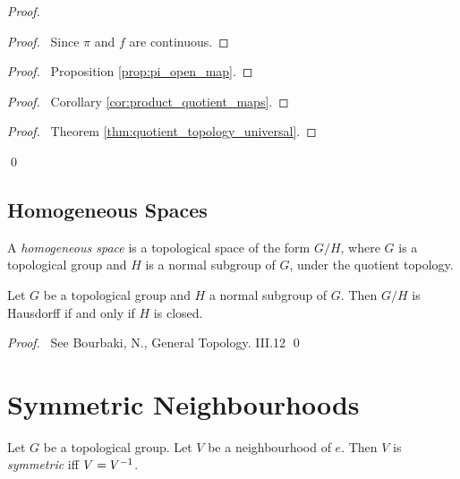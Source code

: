 \begin{proof}
\pf
{}
\begin{proof}
	\pf\ Since $\pi$ and $f$ are continuous.
\end{proof}
\begin{proof}
	\pf\ Proposition \ref{prop:pi_open_map}.
\end{proof}
\begin{proof}
	\pf\ Corollary \ref{cor:product_quotient_maps}.
\end{proof}
\begin{proof}
	\pf\ Theorem \ref{thm:quotient_topology_universal}.
\end{proof}
\qed
\end{proof}

\subsection{Homogeneous Spaces}

\begin{df}
A \emph{homogeneous space} is a topological space of the form $G/H$, where $G$ is a topological group and $H$ is a normal subgroup of $G$, under the quotient topology.
\end{df}

\begin{prop}
Let $G$ be a topological group and $H$ a normal subgroup of $G$. Then $G/H$ is Hausdorff if and only if $H$ is closed.
\end{prop}

\begin{proof}
\pf\ See Bourbaki, N., General Topology. III.12 \qed
\end{proof}

\section{Symmetric Neighbourhoods}

\begin{df}
Let $G$ be a topological group. Let $V$ be a neighbourhood of $e$. Then $V$ is \emph{symmetric} iff $V = {V}^{-1}$.
\end{df}

